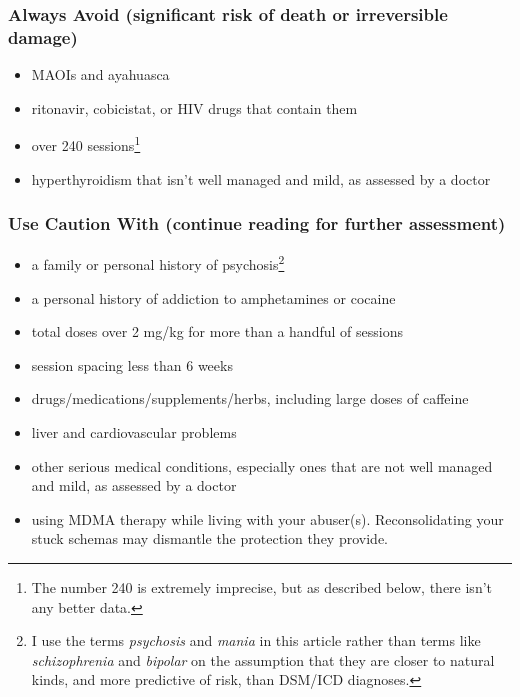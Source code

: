\documentclass[11pt,oneside]{book}
\begin{document}
\subsubsection*{Always Avoid (significant risk of death or irreversible damage)}
\begin{itemize}
    \item MAOIs and ayahuasca
    \item ritonavir, cobicistat, or HIV drugs that contain them
    \item over 240 sessions\footnote{The number 240 is extremely imprecise, but as described below, there isn't any better data.}
    \item hyperthyroidism that isn't well managed and mild,  as assessed by a doctor
\end{itemize}

\subsubsection*{Use Caution With (continue reading for further assessment)}
\begin{itemize}
    \item a family or personal history of psychosis\footnote{I use the terms \textit{psychosis} and \textit{mania} in this article rather than terms like \textit{schizophrenia} and \textit{bipolar} on the assumption that they are closer to natural kinds, and more predictive of risk, than DSM/ICD diagnoses.}
    \item a personal history of addiction to amphetamines or cocaine
    \item total doses over 2 mg/kg for more than a handful of sessions
    \item session spacing less than 6 weeks
    \item drugs/medications/supplements/herbs, including large doses of caffeine
    \item liver and cardiovascular problems
    \item other serious medical conditions, especially ones that are not well managed and mild, as assessed by a doctor
    \item using MDMA therapy while living with your abuser(s). Reconsolidating your stuck schemas may dismantle the protection they provide.
\end{itemize}
\end{document}
